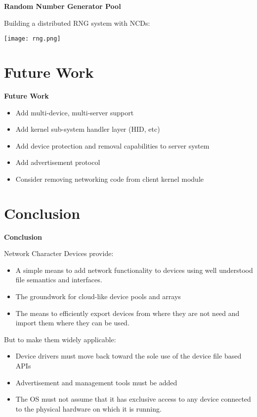 \documentclass[handout]{beamer}
\begin{document}
\begin{frame}{\bf Random Number Generator Pool}

Building a distributed RNG system with NCDs:

  \begin{center}
    \texttt{[image: rng.png]}
  \end{center}

\end{frame}

\section{Future Work}
\begin{frame}{\bf Future Work}

\begin{itemize}
\item<1-> Add multi-device, multi-server support
\item<2-> Add kernel sub-system handler layer (HID, etc)
\item<3-> Add device protection and removal capabilities to server system
\item<4-> Add advertisement protocol
\item<5-> Consider removing networking code from client kernel module
\end{itemize}

\end{frame}

\section{Conclusion}

\begin{frame}{\bf Conclusion}

Network Character Devices provide:

\begin{itemize}
\item<1-> A simple means to add network functionality to devices using
  well understood file semantics and interfaces.
\item<2-> The groundwork for cloud-like device pools and arrays
\item<3-> The means to efficiently export devices from where they are not
  need and import them where they can be used.
\end{itemize}

But to make them widely applicable:

\begin{itemize}
\item<4-> Device drivers must move back toward the sole use of the
  device file based APIs
\item<5-> Advertisement and management tools must be added
\item<6-> The OS must not assume that it has exclusive access to any
  device connected to the physical hardware on which it is running.
\end{itemize}

\end{frame}
\end{document}

